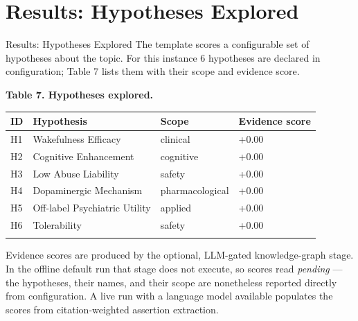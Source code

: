 \documentclass[
  ignorenonframetext,
]{beamer}
\author{\texorpdfstring{}{}}
\date{}
\newcounter{none} %
\begin{document}
\section{Results: Hypotheses
Explored}\label{results-hypotheses-explored}

\begin{frame}[allowframebreaks]{Results: Hypotheses Explored}
The template scores a configurable set of hypotheses about the topic.
For this instance 6 hypotheses are declared in configuration; Table 7
lists them with their scope and evidence score.

\textbf{Table 7. Hypotheses explored.}

{\def\LTcaptype{none} %
\begin{longtable}[]{@{}llll@{}}
\toprule\noalign{}
ID & Hypothesis & Scope & Evidence score \\
\midrule\noalign{}
\endhead
H1 & Wakefulness Efficacy & clinical & +0.00 \\
H2 & Cognitive Enhancement & cognitive & +0.00 \\
H3 & Low Abuse Liability & safety & +0.00 \\
H4 & Dopaminergic Mechanism & pharmacological & +0.00 \\
H5 & Off-label Psychiatric Utility & applied & +0.00 \\
H6 & Tolerability & safety & +0.00 \\
\bottomrule\noalign{}
\end{longtable}
}

Evidence scores are produced by the optional, LLM-gated knowledge-graph
stage. In the offline default run that stage does not execute, so scores
read \emph{pending} --- the hypotheses, their names, and their scope are
nonetheless reported directly from configuration. A live run with a
language model available populates the scores from citation-weighted
assertion extraction.
\end{frame}
\end{document}
